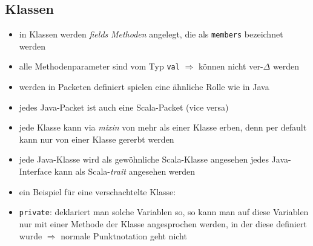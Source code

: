 \subsection{Klassen}
\begin{itemize}
  \item in Klassen werden \textit{fields} \und \textit{Methoden} angelegt,
  die als \texttt{members} bezeichnet werden
  \item alle Methodenparameter sind vom Typ \texttt{val} $\Rightarrow$ 
  können nicht ver-$\Delta$ werden
  \item werden in Packeten definiert \und spielen eine ähnliche 
  Rolle wie in Java
  \item jedes Java-Packet ist auch eine Scala-Packet (vice versa)
  \item jede Klasse kann via \textit{mixin} von mehr als einer Klasse
  erben, denn per default kann nur von einer Klasse gererbt werden
  \item jede Java-Klasse wird als gewöhnliche Scala-Klasse angesehen \und 
  jedes Java-Interface kann als Scala-\textit{trait} angesehen werden
  \item ein Beispiel für eine verschachtelte Klasse:
  
  
  
  \item \texttt{private}: deklariert man solche Variablen so, so kann man auf
  diese Variablen nur mit einer Methode der Klasse angesprochen werden, in
  der diese definiert wurde $\Rightarrow$ normale Punktnotation geht nicht
  
  
  
\end{itemize}


